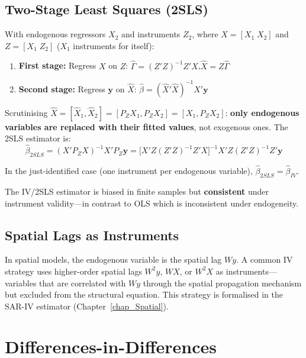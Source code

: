 \subsection{Two-Stage Least Squares (2SLS)}

With endogenous regressors $X_2$ and instruments $Z_2$, where $X = [X_1\;X_2]$
and $Z = [X_1\;Z_2]$ ($X_1$ instruments for itself):

\begin{enumerate}
  \item \textbf{First stage:} Regress $X$ on $Z$:\quad
    $\hat\Gamma = (Z'Z)^{-1}Z'X$,\quad $\hat X = Z\hat\Gamma$
  \item \textbf{Second stage:} Regress $\mathbf{y}$ on $\hat X$:\quad
    $\hat\beta = (\hat X'\hat X)^{-1}\hat X'\mathbf{y}$
\end{enumerate}

Scrutinising $\hat X = [\hat X_1,\hat X_2] = [P_ZX_1, P_ZX_2]
= [X_1, P_ZX_2]$: \textbf{only endogenous variables are replaced with their
fitted values}, not exogenous ones. The 2SLS estimator is:
\begin{equation}
  \hat\beta_{2SLS} = (X'P_ZX)^{-1}X'P_Z\mathbf{y}
  = \bigl[X'Z(Z'Z)^{-1}Z'X\bigr]^{-1}X'Z(Z'Z)^{-1}Z'\mathbf{y}
\end{equation}

In the just-identified case (one instrument per endogenous variable),
$\hat\beta_{2SLS} = \hat\beta_{IV}$.

\begin{tcolorbox}[keyresult]
The IV/2SLS estimator is biased in finite samples but \textbf{consistent}
under instrument validity---in contrast to OLS which is inconsistent under
endogeneity.
\end{tcolorbox}

\subsection{Spatial Lags as Instruments}

In spatial models, the endogenous variable is the spatial lag $Wy$.
A common IV strategy uses higher-order spatial lags $W^2y$, $WX$, or $W^2X$
as instruments---variables that are correlated with $Wy$ through the spatial
propagation mechanism but excluded from the structural equation. This strategy
is formalised in the SAR-IV estimator (Chapter~\ref{chap_Spatial}).


\section{Differences-in-Differences}
\label{sec_DiD}

